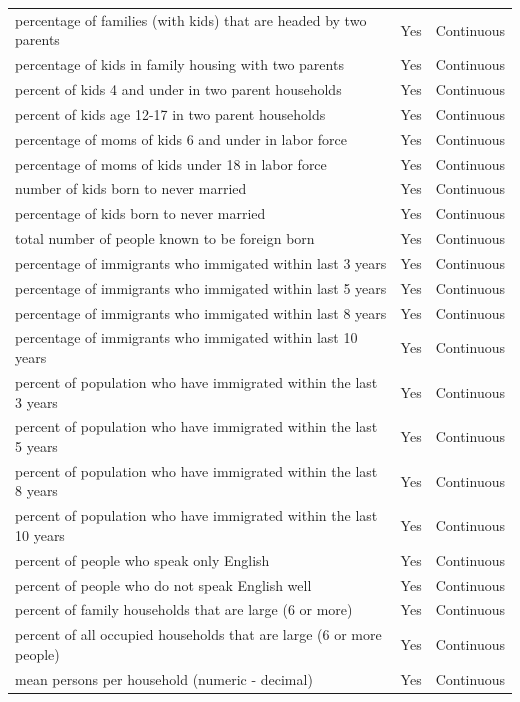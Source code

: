 \documentclass[
  11pt,
]{article}
\begin{document}
\begin{longtable}[t]{lll}
percentage of families (with kids) that are headed by two parents & Yes & Continuous\\
percentage of kids in family housing with two parents & Yes & Continuous\\
\addlinespace
percent of kids 4 and under in two parent households & Yes & Continuous\\
percent of kids age 12-17 in two parent households & Yes & Continuous\\
percentage of moms of kids 6 and under in labor force & Yes & Continuous\\
percentage of moms of kids under 18 in labor force & Yes & Continuous\\
number of kids born to never married & Yes & Continuous\\
\addlinespace
percentage of kids born to never married & Yes & Continuous\\
total number of people known to be foreign born & Yes & Continuous\\
percentage of immigrants who immigated within last 3 years & Yes & Continuous\\
percentage of immigrants who immigated within last 5 years & Yes & Continuous\\
percentage of immigrants who immigated within last 8 years & Yes & Continuous\\
\addlinespace
percentage of immigrants who immigated within last 10 years & Yes & Continuous\\
percent of population who have immigrated within the last 3 years & Yes & Continuous\\
percent of population who have immigrated within the last 5 years & Yes & Continuous\\
percent of population who have immigrated within the last 8 years & Yes & Continuous\\
percent of population who have immigrated within the last 10 years & Yes & Continuous\\
\addlinespace
percent of people who speak only English & Yes & Continuous\\
percent of people who do not speak English well & Yes & Continuous\\
percent of family households that are large (6 or more) & Yes & Continuous\\
percent of all occupied households that are large (6 or more people) & Yes & Continuous\\
mean persons per household (numeric - decimal) & Yes & Continuous\\

\end{longtable}
\end{document}
